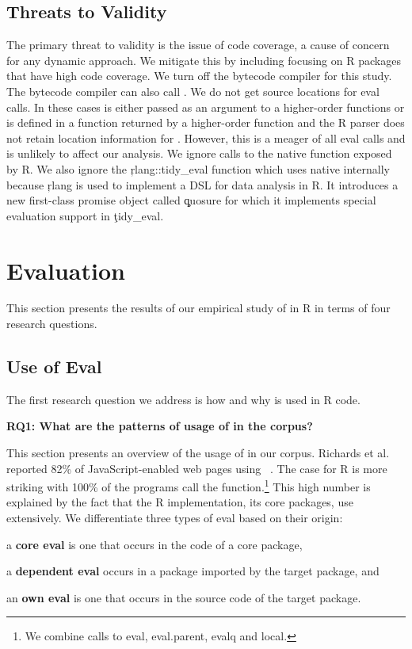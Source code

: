 \documentclass[USenglish,cleveref, autoref, thm-restate]{lipics-v2019}
\begin{document}
\subsection{Threats to Validity}
The primary threat to validity is the issue of
code coverage, a cause of concern for any dynamic approach. We mitigate this
by including focusing on R packages that have high code coverage. We turn
off the bytecode compiler for this study. The bytecode compiler can also
call \eval. We do not get source locations for \UndefinedEvalsRnd eval
calls. In these cases \eval is either passed as an argument to a
higher-order functions or is defined in a function returned by a
higher-order function and the R parser does not retain location information
for \eval. However, this is a meager \PercentUndefinedEval of all eval calls
and is unlikely to affect our analysis. We ignore calls to the native \eval
function exposed by R. We also ignore the \c{rlang::tidy_eval} function
which uses native \eval internally because \c{rlang} is used to implement a
DSL for data analysis in R. It introduces a new first-class promise object
called \c{quosure} for which it implements special evaluation support in
\c{tidy_eval}.

\section{Evaluation}

This section presents the results of our empirical study of \eval in R in terms
of four research questions.

\subsection{Use of Eval}

The first research question we address is how and why \eval is used in R code.

\begin{center}{\bfseries RQ1: What are the patterns of usage of \eval in the corpus?}\end{center}

This section presents an overview of the usage of \eval in our corpus. Richards
et al. reported 82\% of JavaScript-enabled web pages using \eval~\cite{ecoop11}.
The case for R is more striking with 100\% of the programs call the \eval
function.\footnote{We combine calls to {\sf eval}, {\sf eval.parent}, {\sf
    evalq} and {\sf local}.} This high number is explained by the fact that the
R implementation, its core packages, use \eval extensively. We differentiate
three types of eval based on their origin:
%
\begin{compactitem}[$-$]
  \item a {\bf core eval} is one that occurs in the code of a core package,
  \item a {\bf dependent eval} occurs in a package imported by the target
  package, and
  \item an {\bf own eval} is one that occurs in the source code of the target
  package.
\end{compactitem}
\end{document}
